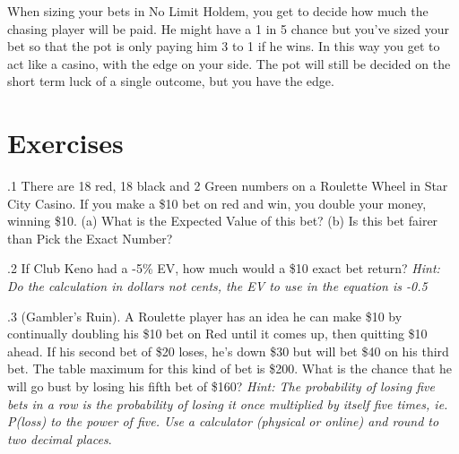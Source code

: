 When sizing your bets in No Limit Holdem, you get to decide how much
the chasing player will be paid. He might have a 1 in 5 chance
but you've sized your bet so that the pot is only paying him 3 to 1
if he wins. In this way you get to act like a casino, with the edge
on your side. The pot will still be decided on the short term luck
of a single outcome, but you have the edge.

\section{Exercises}


.1 There are 18 red, 18 black and 2 Green numbers on
a Roulette Wheel in Star City Casino. If you make a \$10 bet on red
and win, you double your money, winning \$10. (a) What is the Expected
Value of this bet? (b) Is this bet fairer than Pick the Exact Number?

.2 If Club Keno had a -5\% EV, how much would a \$10
exact bet return? \textit{Hint: Do the calculation in dollars not
cents, the EV to use in the equation is -0.5}

.3 (Gambler's Ruin). A Roulette player has an idea he
can make \$10 by continually doubling his \$10 bet on Red until it
comes up, then quitting \$10 ahead. If his second bet of \$20 loses,
he's down \$30 but will bet \$40 on his third bet. The table maximum
for this kind of bet is \$200. What is the chance that he will go bust
by losing his fifth bet of \$160? \textit{Hint: The probability of
losing five bets in a row is the probability of losing it once
multiplied by itself five times, ie. P(loss) to the power of
five. Use a calculator (physical or online) and round to two
decimal places}.
